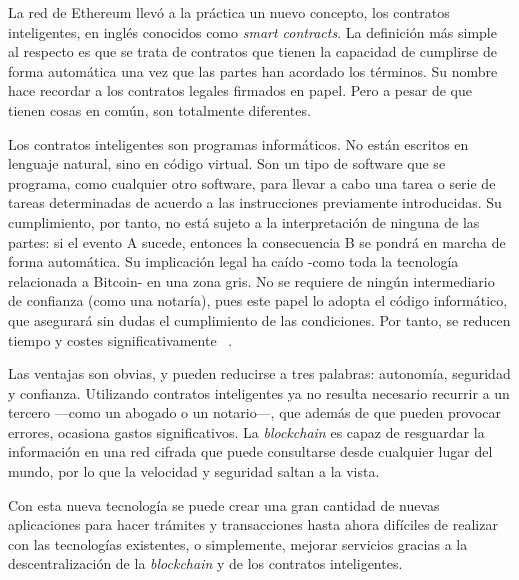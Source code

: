   La red de Ethereum llevó a la práctica un nuevo concepto, los contratos inteligentes, en inglés conocidos como \textit{smart contracts}. 
  La definición más simple al respecto es que se trata de contratos que tienen la capacidad de cumplirse de forma automática una vez que 
  las partes han acordado los términos. Su nombre hace recordar a los contratos legales firmados en papel. Pero a pesar de que tienen 
  cosas en común, son totalmente diferentes. 

  Los contratos inteligentes son programas informáticos. No están escritos en lenguaje natural, sino en código virtual. Son un 
  tipo de software que se programa, como cualquier otro software, para llevar a cabo una tarea o serie de tareas determinadas de acuerdo a 
  las instrucciones previamente introducidas. Su cumplimiento, por tanto, no está sujeto a la interpretación de ninguna de las partes: si 
  el evento A sucede, entonces la consecuencia B se pondrá en marcha de forma automática. Su implicación legal ha caído -como toda la 
  tecnología relacionada a Bitcoin- en una zona gris. No se requiere de ningún intermediario de confianza (como una notaría), pues este 
  papel lo adopta el código informático, que asegurará sin dudas el cumplimiento de las condiciones. Por tanto, se reducen tiempo y costes 
  significativamente ~\parencite{smartcontract}. 


  Las ventajas son obvias, y pueden reducirse a tres palabras: autonomía, seguridad y confianza. Utilizando contratos inteligentes ya no 
  resulta necesario recurrir a un tercero —como un abogado o un notario—, que además de que pueden provocar errores, ocasiona gastos 
  significativos. La \textit{blockchain} es capaz de resguardar la información en una red cifrada que puede consultarse desde cualquier lugar del 
  mundo, por lo que la velocidad y seguridad saltan a la vista.

  Con esta nueva tecnología se puede crear una gran cantidad de nuevas aplicaciones para hacer trámites y transacciones hasta ahora difíciles de realizar con las tecnologías existentes, o simplemente, mejorar servicios gracias a la descentralización de la \textit{blockchain} y de los contratos inteligentes.

